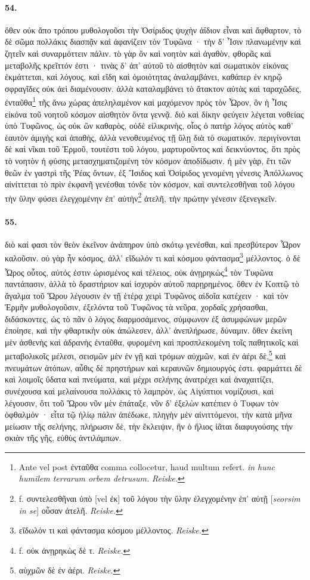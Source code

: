 \documentclass[a4paper, 11pt, oneside, polutonikogreek, german]{article}
\begin{document}
\paragraph{54.}
ὅθεν οὐκ ἄπο τρόπου μυθολογοῦσι τὴν Ὀσίριδος ψυχὴν ἀΐδιον εἶναι καὶ ἄφθαρτον, τὸ δὲ σῶμα πολλάκις διασπᾷν καὶ ἀφανίζειν τὸν Τυφῶνα · τὴν δ' Ἶσιν πλανωμένην καὶ ζητεῖν καὶ συναρμόττειν πάλιν. τὸ γὰρ ὂν καὶ νοητὸν καὶ ἀγαθὸν, φθορᾶς καὶ μεταβολῆς κρεῖττόν ἐστι · τινὰς δ' ἀπ' αὐτοῦ τὸ αἰσθητὸν καὶ σωματικὸν εἰκόνας ἐκμάττεται, καὶ λόγους, καὶ εἴδη καὶ ὁμοιότητας ἀναλαμβάνει, καθάπερ ἐν κηρῷ σφραγῖδες οὐκ ἀεὶ διαμένουσιν. ἀλλὰ καταλαμβάνει τὸ ἄτακτον αὐτὰς καὶ ταραχῶδες, ἐνταῦθα\footnote{Ante vel post ἐνταῦθα comma collocetur, haud multum refert. \emph{in hunc humilem terrarum orbem detrusum.} \emph{Reiske.}} τῆς ἄνω χώρας ἀπεληλαμένον καὶ μαχόμενον πρὸς τὸν Ὧρον, ὃν ἡ Ἶσις εἰκόνα τοῦ νοητοῦ κόσμον αἰσθητὸν ὄντα γεννᾷ. διὸ καὶ δίκην φεύγειν λέγεται νοθείας ὑπὸ Τυφῶνος, ὡς οὐκ ὢν καθαρὸς, οὐδὲ εἰλικρινὴς, οἷος ὁ πατὴρ λόγος αὐτὸς καθ' ἑαυτὸν ἀμιγὴς καὶ ἀπαθὴς, ἀλλὰ νενοθευμένος τῇ ὕλῃ διὰ τὸ σωματικόν. περιγίνονται δὲ καὶ νῖκαι τοῦ Ἑρμοῦ, τουτέστι τοῦ λόγου, μαρτυροῦντος καὶ δεικνύοντος, ὅτι πρὸς τὸ νοητὸν ἡ φύσης μετασχηματιζομένη τὸν κόσμον ἀποδίδωσιν. ἡ μὲν γὰρ, ἔτι τῶν θεῶν ἐν γαστρὶ τῆς Ῥέας ὄντων, ἐξ Ἴσιδος καὶ Ὀσίριδος γενομένη γένεσις Ἀπόλλωνος αἰνίττεται τὸ πρὶν ἐκφανῆ γενέσθαι τόνδε τὸν κόσμον, καὶ συντελεσθῆναι τοῦ λόγου τὴν ὕλην φύσει ἐλεγχομένην ἐπ' αὐτὴν\footnote{f. συντελεσθῆναι ὑπὸ [vel ἐκ] τοῦ λόγου τὴν ὕλην ἐλεγχομένην ἐπ' αὐτῇ [\emph{seorsim in se}] οὖσαν ἀτελῆ. \emph{Reiske.}} ἀτελῆ, τὴν πρώτην γένεσιν ἐξενεγκεῖν.

\paragraph{55.}
διὸ καί φασι τὸν θεὸν ἐκεῖνον ἀνάπηρον ὑπὸ σκότῳ γενέσθαι, καὶ πρεσβύτερον Ὧρον καλοῦσιν. οὐ γὰρ ἦν κόσμος, ἀλλ' εἴδωλόν τι καὶ κόσμου φάντασμα\footnote{εἴδωλόν τι καὶ φάντασμα κόσμου μέλλοντος. \emph{Reiske.}} μέλλοντος. ὁ δὲ Ὧρος οὗτος, αὐτός ἐστιν ὡρισμένος καὶ τέλειος, οὐκ ἀνῃρηκὼς\footnote{f. οὐκ ἀνῃρηκὼς δὲ τ. \emph{Reiske.}} τὸν Τυφῶνα παντάπασιν, ἀλλὰ τὸ δραστήριον καὶ ἰσχυρὸν αὐτοῦ παρῃρημένος. ὅθεν ἐν Κοπτῷ τὸ ἄγαλμα τοῦ Ὥρου λέγουσιν ἐν τῇ ἑτέρᾳ χειρὶ Τυφῶνος αἰδοῖα κατέχειν · καὶ τὸν Ἑρμῆν μυθολογοῦσιν, ἐξελόντα τοῦ Τυφῶνος τὰ νεῦρα, χορδαῖς χρήσασθαι, διδάσκοντες, ὡς τὸ πᾶν ὁ λόγος διαρμοσάμενος, σύμφωνον ἐξ ἀσυμφώνων μερῶν ἐποίησε, καὶ τὴν φθαρτικὴν οὐκ ἀπώλεσεν, ἀλλ' ἀνεπλήρωσε, δύναμιν. ὅθεν ἐκείνη μὲν ἀσθενὴς καὶ ἀδρανὴς ἐνταῦθα, φυρομένη καὶ προσπλεκομένη τοῖς παθητικοῖς καὶ μεταβολικοῖς μέλεσι, σεισμῶν μὲν ἐν γῇ καὶ τρόμων αὐχμῶν, καὶ ἐν ἀέρι δὲ,\footnote{αὐχμῶν δὲ ἐν ἀέρι. \emph{Reiske.}} καὶ πνευμάτων ἀτόπων, αὖθις δὲ πρηστήρων καὶ κεραυνῶν δημιουργός ἐστι. φαρμάττει δὲ καὶ λοιμοῖς ὕδατα καὶ πνεύματα, καὶ μέχρι σελήνης ἀνατρέχει καὶ ἀναχαιτίζει, συνέχουσα καὶ μελαίνουσα πολλάκις τὸ λαμπρὸν, ὡς Αἰγύπτιοι νομίζουσι, καὶ λέγουσιν, ὅτι τοῦ Ὥρου νῦν μὲν ἐπάταξε, νῦν δ' ἐξελὼν κατέπιεν ὁ Τυφων τὸν ὀφθαλμόν · εἶτα τῷ ἡλίῳ πάλιν ἀπέδωκε, πληγὴν μὲν αἰνιττόμενοι, τὴν κατὰ μῆνα μείωσιν τῆς σελήνης, πλήρωσιν δὲ, τὴν ἔκλειψιν, ἣν ὁ ἥλιος ἰᾶται διαφυγούσης τὴν σκιὰν τῆς γῆς, εὐθὺς ἀντιλάμπων.
\end{document}
